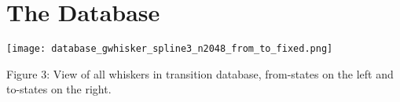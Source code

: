 \section*{The Database}

\centering\texttt{[image: database\_gwhisker\_spline3\_n2048\_from\_to\_fixed.png]}
\begin{center}
\label{fig:database}
Figure 3: View of all whiskers in transition database, from-states on the left and to-states on the right.
\end{center}
